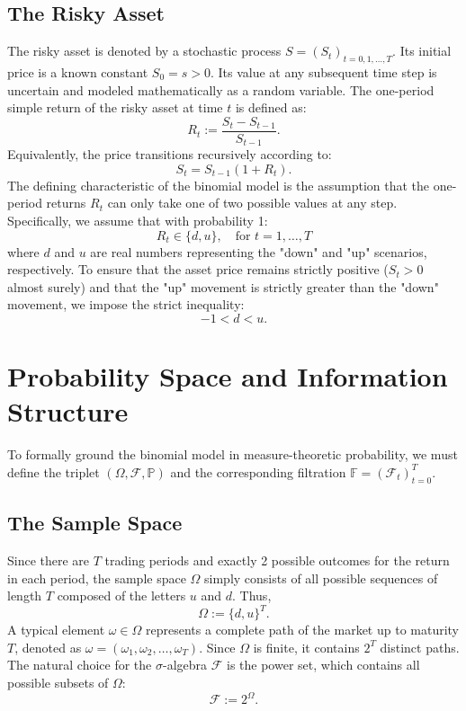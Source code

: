 \subsection{The Risky Asset}
The risky asset is denoted by a stochastic process $S = (S_t)_{t=0,1,\dots,T}$. Its initial price is a known constant $S_0 = s > 0$. Its value at any subsequent time step is uncertain and modeled mathematically as a random variable. The one-period simple return of the risky asset at time $t$ is defined as:
\begin{equation}
    R_t := \frac{S_t - S_{t-1}}{S_{t-1}}.
\end{equation}
Equivalently, the price transitions recursively according to:
\begin{equation}
    S_t = S_{t-1}(1 + R_t).
\end{equation}
The defining characteristic of the binomial model is the assumption that the one-period returns $R_t$ can only take one of two possible values at any step. Specifically, we assume that with probability 1:
\begin{equation}
    R_t \in \{d, u\}, \quad \text{for } t=1, \dots, T
\end{equation}
where $d$ and $u$ are real numbers representing the "down" and "up" scenarios, respectively. To ensure that the asset price remains strictly positive ($S_t > 0$ almost surely) and that the "up" movement is strictly greater than the "down" movement, we impose the strict inequality:
\begin{equation}
    -1 < d < u.
\end{equation}

\section{Probability Space and Information Structure}

To formally ground the binomial model in measure-theoretic probability, we must define the triplet $(\Omega, \mathcal{F}, \mathbb{P})$ and the corresponding filtration $\mathbb{F} = (\mathcal{F}_t)_{t=0}^T$.

\subsection{The Sample Space}
Since there are $T$ trading periods and exactly 2 possible outcomes for the return in each period, the sample space $\Omega$ simply consists of all possible sequences of length $T$ composed of the letters $u$ and $d$. Thus,
\begin{equation}
    \Omega := \{d, u\}^T.
\end{equation}
A typical element $\omega \in \Omega$ represents a complete path of the market up to maturity $T$, denoted as $\omega = (\omega_1, \omega_2, \dots, \omega_T)$. Since $\Omega$ is finite, it contains $2^T$ distinct paths. The natural choice for the $\sigma$-algebra $\mathcal{F}$ is the power set, which contains all possible subsets of $\Omega$:
\begin{equation}
    \mathcal{F} := 2^{\Omega}.
\end{equation}

